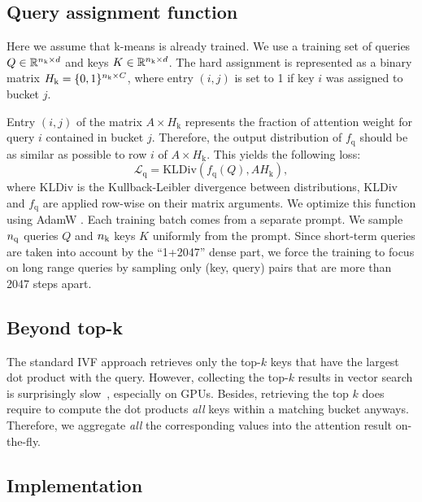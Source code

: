\subsection{Query assignment function}
\label{sec:qpart}

Here we assume that k-means is already trained.
We use a training set of queries $Q\in \mathbb{R}^{n_{\mathrm{k}} \times d}$ and keys $K\in \mathbb{R}^{n_{\mathrm{k}} \times d}$. 
The hard assignment is represented as a binary matrix $H_\mathrm{k} = \{0, 1\}^{n_{\mathrm{k}} \times C}$,  where entry $(i, j)$ is set to 1 if key $i$ was assigned to bucket $j$.

Entry $(i, j)$  of the matrix $A \times H_\mathrm{k}$ represents the fraction of attention weight for query $i$ contained in bucket $j$.
Therefore, the output distribution of $f_\mathrm{q}$ should be as similar as possible to row $i$ of $A \times H_\mathrm{k}$. 
This yields the following loss: 
\begin{equation}
    \mathcal{L}_\mathrm{q} = 
    \mathrm{KLDiv}\left(f_\mathrm{q}(Q), A H_\mathrm{k}\right), 
\end{equation}
where $\mathrm{KLDiv}$ is the Kullback-Leibler divergence between distributions, $\mathrm{KLDiv}$ and $f_\mathrm{q}$ are applied row-wise on their matrix arguments. 
%
We optimize this function using AdamW \cite{loshchilov2017fixing}.  
Each training batch comes from a separate prompt. 
We sample $n_{\mathrm{q}}$ queries $Q$ and $n_{\mathrm{k}}$ keys $K$ uniformly from the prompt. 
Since short-term queries are taken into account by the ``1+2047'' dense part, we force the training to focus on long range queries by sampling only (key, query) pairs that are more than 2047 steps apart. 


\subsection{Beyond top-k}
\label{sec:beyondtopk}

The standard IVF approach retrieves only the top-$k$ keys that have the largest dot product with the query. 
However, collecting the top-$k$ results in vector search is surprisingly slow~\citep{johnson2019billion}, especially on GPUs. 
Besides, retrieving the top $k$ does require to compute the dot products \wrt \emph{all} keys within a matching bucket anyways. 
Therefore, we aggregate \emph{all} the corresponding values into the attention result on-the-fly.
%


\subsection{Implementation}
\label{sec:implem}

